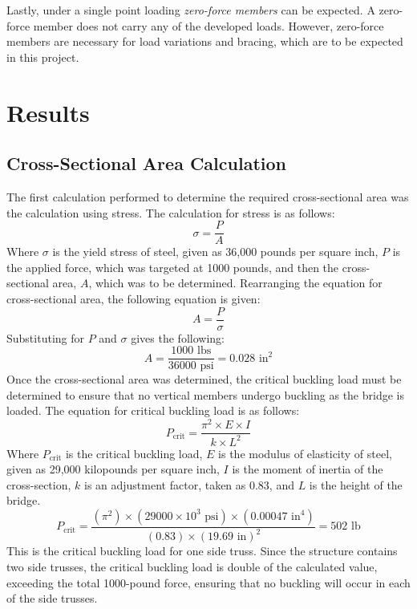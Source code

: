 \documentclass{article}
\begin{document}
    Lastly, under a single point loading \emph{zero-force members} can be expected. A zero-force member does not carry any of the developed loads. However, zero-force members are necessary for load variations and bracing, which are to be expected in this project.
    \newpage
    \section{Results}
    \doublespacing

    \subsection{Cross-Sectional Area Calculation}
    \noindent The first calculation performed to determine the required cross-sectional area was the calculation using stress. The calculation for stress is as follows:
    \[\sigma=\frac{P}{A}\] 
    \noindent Where \(\sigma\) is the yield stress of steel, given as 36,000 pounds per square inch, \(P\) is the applied force, which was targeted at 1000 pounds, and then the cross-sectional area, \(A\), which was to be determined. Rearranging the equation for cross-sectional area, the following equation is given:
    \[A=\frac{P}{\sigma}\] 
    \noindent Substituting for \(P\) and \(\sigma\) gives the following:
    \[A=\frac{1000 \text{ lbs}}{36000\text{ psi}}=\boxed{0.028 \text{ in}^2}\]
    \noindent Once the cross-sectional area was determined, the critical buckling load must be determined to ensure that no vertical members undergo buckling as the bridge is loaded. The equation for critical buckling load is as follows:
    \[P_\text{crit}=\frac{\pi^2\times E\times I}{k\times L^2}\]
    Where \(P_\text{crit}\) is the critical buckling load, \(E\) is the modulus of elasticity of steel, given as 29,000 kilopounds per square inch, \(I\) is the moment of inertia of the cross-section, \(k\) is an adjustment factor, taken as 0.83, and \(L\) is the height of the bridge.
    \[P_\text{crit}=\frac{(\pi^2)\times (29000\times10^3\text{ psi})\times (0.00047\text{ in}^4)}{(0.83)\times (19.69\text{ in})^2}=\boxed{502\text { lb}}\]
    This is the critical buckling load for one side truss. Since the structure contains two side trusses, the critical buckling load is double of the calculated value, exceeding the total 1000-pound force, ensuring that no buckling will occur in each of the side trusses.
    \newpage
\end{document}
